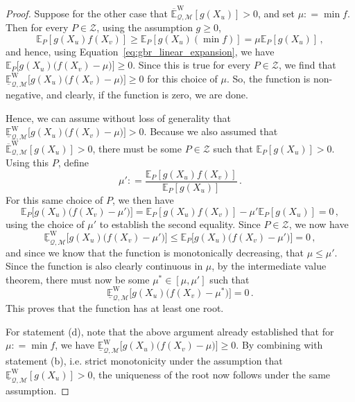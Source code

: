 \documentclass[twoside,11pt]{article}
\newcommand{\lexp}{\underline{\mathbb{E}}_{\rateset,\mathcal{M}}^\mathrm{W}}
\newcommand{\uexp}{\overline{\mathbb{E}}_{\rateset,\mathcal{M}}^\mathrm{W}}
\newcommand{\rateset}{\mathcal{Q}}
\newcommand{\coloneqq}{:\!=}
\begin{document}
\begin{proof}
Suppose for the other case that $\uexp[g(X_u)]>0$, and set $\mu\coloneqq \min f$. Then for every $P\in\mathcal{Z}$, using the assumption $g\geq 0$,
\begin{equation*}
\mathbb{E}_P[g(X_u)f(X_v)] \geq \mathbb{E}_P[g(X_u)(\min f)] = \mu\mathbb{E}_P[g(X_u)]\,,
\end{equation*}
and hence, using Equation~\eqref{eq:gbr_linear_expansion}, we have $\mathbb{E}_P\bigl[g(X_u)\bigl(f(X_v) - \mu\bigr)\bigr] \geq 0$. Since this is true for every $P\in\mathcal{Z}$, we find that $\lexp\bigl[g(X_u)\bigl(f(X_v) - \mu\bigr)\bigr]\geq 0$ for this choice of $\mu$. So, the function is non-negative, and clearly, if the function is zero, we are done.

Hence, we can assume without loss of generality that $\lexp\bigl[g(X_u)\bigl(f(X_v) - \mu\bigr)\bigr] > 0$. Because we also assumed that $\uexp[g(X_u)] > 0$, there must be some $P\in\mathcal{Z}$ such that $\mathbb{E}_P[g(X_u)]>0$. Using this $P$, define
\begin{equation*}
\mu' \coloneqq \frac{\mathbb{E}_P[g(X_u)f(X_v)]}{\mathbb{E}_P[g(X_u)]}\,.
\end{equation*}
For this same choice of $P$, we then have
\begin{equation*}
\mathbb{E}_P\bigl[g(X_u)\bigl(f(X_v) - \mu'\bigr)\bigr] = \mathbb{E}_P[g(X_u)f(X_v)] - \mu'\mathbb{E}_P[g(X_u)] = 0\,,
\end{equation*}
using the choice of $\mu'$ to establish the second equality. Since $P\in\mathcal{Z}$, we now have
\begin{equation*}
\lexp\bigl[g(X_u)\bigl(f(X_v) - \mu'\bigr)\bigr] \leq \mathbb{E}_P\bigl[g(X_u)\bigl(f(X_v) - \mu'\bigr)\bigr] = 0\,,
\end{equation*}
and since we know that the function is monotonically decreasing, that $\mu\leq \mu'$. Since the function is also clearly continuous in $\mu$, by the intermediate value theorem, there must now be some $\mu^*\in [\mu,\mu']$ such that
\begin{equation*}
\lexp\bigl[g(X_u)\bigl(f(X_v) - \mu^*\bigr)\bigr] = 0\,.
\end{equation*}
This proves that the function has at least one root.

For statement (d), note that the above argument already established that for $\mu\coloneqq \min f$, we have $\lexp\bigl[g(X_u)\bigl(f(X_v) - \mu\bigr)\bigr]\geq 0$. By combining with statement (b), i.e. strict monotonicity under the assumption that $\lexp[g(X_u)]>0$, the uniqueness of the root now follows under the same assumption.
\end{proof}
\end{document}

